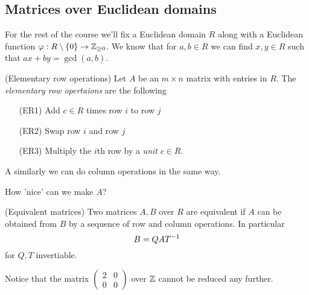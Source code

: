 \documentclass{article}
\begin{document}
\begin{itemize}
\subsection{Matrices over Euclidean domains}
For the rest of the course we'll fix a Euclidean domain $ R $ along with a Euclidean function $ \varphi: R\setminus \{0\}\to \mathbb{Z}_{\ge 0} $. We know that for $ a,b\in R $ we can find $ x,y\in R $ such that $ ax+by=\gcd(a,b) $.
\begin{definition}
	(Elementary row operations) Let $ A $ be an $ m\times n $ matrix with entries in $ R $. The \textit{elementary row opertaions} are the following
	\begin{itemize}
		\item [(ER1)] Add $ c\in R $ times row $ i $ to row $ j $
		\item [(ER2)] Swap row $ i $ and row $ j $
		\item [(ER3)] Multiply the $ i $th row by a \textit{unit} $ c\in R $. 
	\end{itemize}
	A similarly we can do column operations in the same way.
\end{definition}
How 'nice' can we make $ A $?
\begin{definition}
	(Equivalent matrices) Two matrices $ A,B $ over $ R $ are equivalent if $ A $ can be obtained from $ B $ by a sequence of row and column operations. In particular
	\[
	  B=QA{T}^{-1}
	\]
	for $ Q,T $ invertiable.
\end{definition}
Notice that the matrix $
\begin{pmatrix}
	2 & 0 \\
	0 & 0 
\end{pmatrix} $
over $ \mathbb{Z} $ cannot be reduced any further.


\end{itemize}
\end{document}
